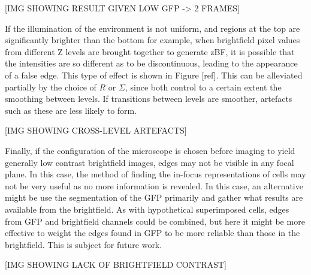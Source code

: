 [IMG SHOWING RESULT GIVEN LOW GFP -> 2 FRAMES]

If the illumination of the environment is not uniform, and regions at the top are significantly brighter than the bottom for example, when brightfield pixel values from different Z levels are brought together to generate zBF, it is possible that the intensities are so different as to be discontinuous, leading to the appearance of a false edge. This type of effect is shown in Figure [ref]. This can be alleviated partially by the choice of $R$ or $\Sigma$, since both control to a certain extent the smoothing between levels. If transitions between levels are smoother, artefacts such as these are less likely to form.

[IMG SHOWING CROSS-LEVEL ARTEFACTS]

Finally, if the configuration of the microscope is chosen before imaging to yield generally low contrast brightfield images, edges may not be visible in any focal plane. In this case, the method of finding the in-focus representations of cells may not be very useful as no more information is revealed. In this case, an alternative might be use the segmentation of the GFP primarily and gather what results are available from the brightfield. As with hypothetical superimposed cells, edges from GFP and brightfield channels could be combined, but here it might be more effective to weight the edges found in GFP to be more reliable than those in the brightfield. This is subject for future work.

[IMG SHOWING LACK OF BRIGHTFIELD CONTRAST]
